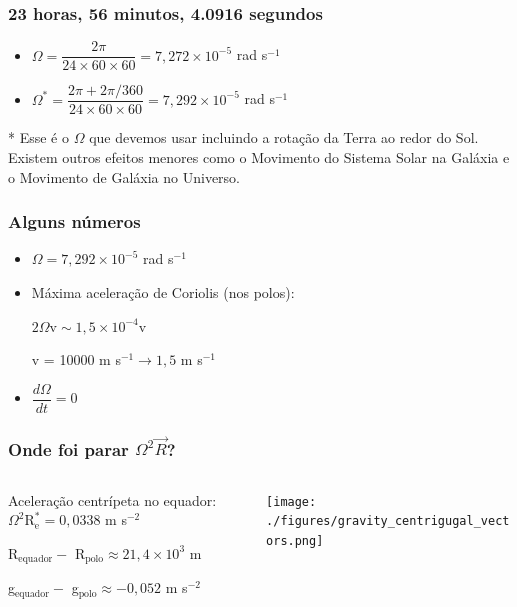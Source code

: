 \begin{frame}
  \frametitle{23 horas, 56 minutos, 4.0916 segundos}
  \begin{itemize}[<+-| alert@+>]
    \item $\Omega = \dfrac{2\pi} {24 \times 60 \times 60} =
           7,272 \times 10^{-5}$ rad s$^{-1}$
    \item $\Omega^* = \dfrac{2\pi + 2\pi/360} {24 \times 60 \times 60} =
           7,292 \times 10^{-5}$ rad s$^{-1}$
  \end{itemize}
  \pause
  \small{* Esse é o $\Omega$ que devemos usar incluindo a rotação da Terra ao
         redor do Sol.  Existem outros efeitos menores como o Movimento do
         Sistema Solar na Galáxia e o Movimento de Galáxia no Universo.}
\end{frame}

\begin{frame}
  \frametitle{Alguns números}
  \begin{itemize}[<+-| alert@+>]
    \item $\Omega = 7,292 \times 10^{-5}$ rad s$^{-1}$
    \item Máxima aceleração de Coriolis (nos polos):

        $2\Omega \text{v} \sim 1,5 \times 10^{-4}\text{v}$

        v = 10000 m s$^{-1}  \rightarrow 1,5$ m s$^{-1}$
    \item $\dfrac{d\Omega}{dt} = 0$
  \end{itemize}
\end{frame}


\begin{frame}
  \frametitle{Onde foi parar $\Omega^2\vec{R}$?}

  \begin{columns}
    \begin{column}{0.5\textwidth}
    \small{
      Aceleração centrípeta no equador:
      $\Omega^2\text{R}_{\text{e}}^{*} = 0,0338$ m s$^{-2}$

      R$_{\text{equador}} -$ R$_{\text{polo}} \approx 21,4 \times 10^{3}$ m

      g$_{\text{equador}} -$ g$_{\text{polo}} \approx -0,052$ m s$^{-2}$
      }
    \end{column}
    \begin{column}{0.5\textwidth}
      \begin{center}
        \texttt{[image: ./figures/gravity\_centrigugal\_vectors.png]}
      \end{center}
    \end{column}
  \end{columns}
\end{frame}

